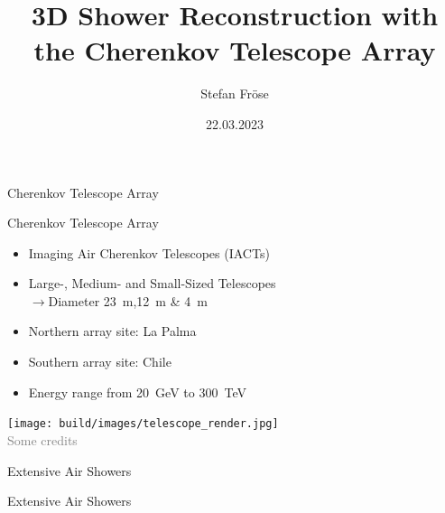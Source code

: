 \documentclass[aspectratio=1610, 9pt]{beamer}
\title{3D Shower Reconstruction with the Cherenkov Telescope Array}
\author[S.~Fröse]{Stefan Fröse}
\institute[WG Elsässer]{WG Elsässer \\  Faculty of Physics}
\date{22.03.2023}
\begin{document}
\maketitle

\begin{frame}
  \begin{center}
    \fontsize{40}{48} \selectfont\textcolor{tugreen}{Cherenkov Telescope Array}
  \end{center}
\end{frame}

\begin{frame}{Cherenkov Telescope Array}
    \begin{minipage}{0.49\textwidth}
        \begin{itemize}
            \item Imaging Air Cherenkov Telescopes (IACTs)
            \item Large-, Medium- and Small-Sized Telescopes\\$\rightarrow$Diameter \SI{23}{\meter},\SI{12}{\meter} \& \SI{4}{\meter}
            \item Northern array site: La Palma
            \item Southern array site: Chile
            \item Energy range from \SI{20}{\GeV} to \SI{300}{\TeV}
        \end{itemize}
    \end{minipage}
    \hfill
    \begin{minipage}{0.5\textwidth}
        \centering
        \texttt{[image: build/images/telescope\_render.jpg]}\\
        \tiny{{\textcolor{gray}{Some credits}}}
    \end{minipage}
\end{frame}

\begin{frame}
  \begin{center}
    \fontsize{40}{48} \selectfont\textcolor{tugreen}{Extensive Air Showers}
  \end{center}
\end{frame}

\begin{frame}{Extensive Air Showers}
    \centering
\end{frame}
\end{document}

